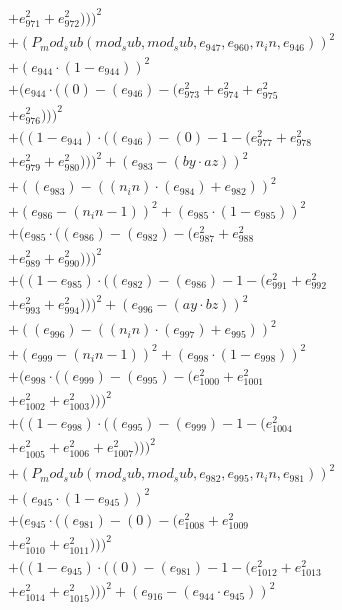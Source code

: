 \documentclass[10pt, a4paper]{article}
\begin{document}
\begin{align*}
& + e_{971}^{2} + e_{972}^{2})))^{2} \\
& + (P_mod_sub(mod_sub, mod_sub, e_{947}, e_{960}, n_in, e_{946}))^{2} \\
& + (e_{944}  \cdot  (1 - e_{944}))^{2} \\
& + (e_{944}  \cdot  ((0) - (e_{946}) - (e_{973}^{2} + e_{974}^{2} + e_{975}^{2} \\
& + e_{976}^{2})))^{2} \\
& + ((1 - e_{944})  \cdot  ((e_{946}) - (0) - 1 - (e_{977}^{2} + e_{978}^{2} \\
& + e_{979}^{2} + e_{980}^{2})))^{2} + (e_{983} - (by  \cdot  az))^{2} \\
& + ((e_{983}) - ((n_in)  \cdot  (e_{984}) + e_{982}))^{2} \\
& + (e_{986} - (n_in - 1))^{2} + (e_{985}  \cdot  (1 - e_{985}))^{2} \\
& + (e_{985}  \cdot  ((e_{986}) - (e_{982}) - (e_{987}^{2} + e_{988}^{2} \\
& + e_{989}^{2} + e_{990}^{2})))^{2} \\
& + ((1 - e_{985})  \cdot  ((e_{982}) - (e_{986}) - 1 - (e_{991}^{2} + e_{992}^{2} \\
& + e_{993}^{2} + e_{994}^{2})))^{2} + (e_{996} - (ay  \cdot  bz))^{2} \\
& + ((e_{996}) - ((n_in)  \cdot  (e_{997}) + e_{995}))^{2} \\
& + (e_{999} - (n_in - 1))^{2} + (e_{998}  \cdot  (1 - e_{998}))^{2} \\
& + (e_{998}  \cdot  ((e_{999}) - (e_{995}) - (e_{1000}^{2} + e_{1001}^{2} \\
& + e_{1002}^{2} + e_{1003}^{2})))^{2} \\
& + ((1 - e_{998})  \cdot  ((e_{995}) - (e_{999}) - 1 - (e_{1004}^{2} \\
& + e_{1005}^{2} + e_{1006}^{2} + e_{1007}^{2})))^{2} \\
& + (P_mod_sub(mod_sub, mod_sub, e_{982}, e_{995}, n_in, e_{981}))^{2} \\
& + (e_{945}  \cdot  (1 - e_{945}))^{2} \\
& + (e_{945}  \cdot  ((e_{981}) - (0) - (e_{1008}^{2} + e_{1009}^{2} \\
& + e_{1010}^{2} + e_{1011}^{2})))^{2} \\
& + ((1 - e_{945})  \cdot  ((0) - (e_{981}) - 1 - (e_{1012}^{2} + e_{1013}^{2} \\
& + e_{1014}^{2} + e_{1015}^{2})))^{2} + (e_{916} - (e_{944}  \cdot  e_{945}))^{2} \\

\end{align*}
\end{document}

